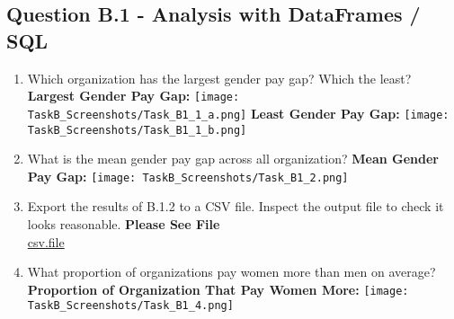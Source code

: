\documentclass[12pt]{article}
\begin{document}
\subsection{Question B.1 - Analysis with DataFrames / SQL}
\begin{enumerate}
\item Which organization has the largest gender pay gap? Which the least?
\newline
\newline
	\textbf{Largest Gender Pay Gap:}
    \newline
    \texttt{[image: TaskB\_Screenshots/Task\_B1\_1\_a.png]}
    \newline
    \newline
    \textbf{Least Gender Pay Gap:}
    \newline
    \texttt{[image: TaskB\_Screenshots/Task\_B1\_1\_b.png]}
\newpage
\item What is the mean gender pay gap across all organization?
\newline
\newline
	\textbf{Mean Gender Pay Gap:}
    \newline
    \texttt{[image: TaskB\_Screenshots/Task\_B1\_2.png]}
\newline
\newline
\item Export the results of B.1.2 to a CSV file. Inspect the output file to check it looks reasonable.
\newline
\newline
	\textbf{Please See File} \\
    \href{run:./Task_B_1_3.csv}{csv.file}
\newline
\newline
\item What proportion of organizations pay women more than men on average?
\newline
\newline
	\textbf{Proportion of Organization That Pay Women More:}
    \newline
    \texttt{[image: TaskB\_Screenshots/Task\_B1\_4.png]}
\end{enumerate}
\newpage
\end{document}
